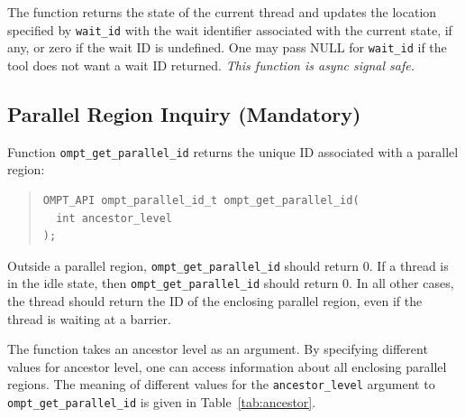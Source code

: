 \documentclass{article}
\begin{document}
\noindent
The function returns the state of the current thread and updates
 the location specified by \verb|wait_id| with the wait
 identifier associated with the current state, if any, or zero if the wait ID is undefined.
One may pass NULL for \verb|wait_id| if the tool does not want a wait ID returned.
 {\em This function is async signal safe.}
 

\subsection{Parallel Region Inquiry (Mandatory)} 
\label{sec:parallel-inquiry} 
Function \verb|ompt_get_parallel_id| returns  
 the unique ID associated with a parallel region:
 
 
\begin{quote}
\begin{verbatim}
OMPT_API ompt_parallel_id_t ompt_get_parallel_id(
  int ancestor_level
);
\end{verbatim}
\end{quote}

\noindent 
Outside a parallel region, \verb|ompt_get_parallel_id| should return 0. If a thread is in the idle state, then \verb|ompt_get_parallel_id| should return 0.  
In all other cases, 
the thread should return the ID of the enclosing parallel region, even if the thread is waiting at a barrier.

The function takes an ancestor level as an argument. By specifying different values for
ancestor level, one can access information about all enclosing parallel regions. The meaning of different values for the \verb|ancestor_level| argument to \verb|ompt_get_parallel_id| is given in Table~\ref{tab:ancestor}.
\end{document}
